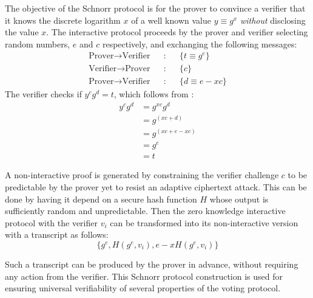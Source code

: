 The objective of the Schnorr protocol is for the prover to convince a
verifier that it knows the discrete logarithm $x$ of a well known
value $y \equiv g^x$ \emph{without} disclosing the value $x$.  The interactive
protocol proceeds by the prover and verifier selecting random numbers,
$e$ and $c$ respectively,
and exchanging the following messages:
\[
\begin{array}{lcccc} 
  \text{Prover} \rightarrow \text{Verifier} & & : & & \{ t \equiv g^e  \} \\
  \text{Verifier} \rightarrow \text{Prover} & & : & & \{ c \} \\
  \text{Prover} \rightarrow \text{Verifier} & & : & & \{ d \equiv e - xc \} 
\end{array}
\]
The verifier checks if $y^cg^d = t$, which follows from :
\begin{equation} \label{eq2}
\begin{split}
y^cg^d & = g^{xc}g^d \\
       & = g^{(xc + d)}  \\
       & = g^{(xc + e - xc)} \\
       & = g^e \\
       & = t 
\end{split}
\end{equation}

A non-interactive proof is generated by constraining the verifier challenge
$c$ to be predictable by the prover yet to resist an adaptive
ciphertext attack.
This can be done by having it depend on a secure hash function $H$ whose
output is sufficiently random and unpredictable.  Then the zero
knowledge interactive protocol with the verifier $v_i$
can be transformed into its non-interactive version with a
transcript as follows:
\[
\{ g^e , H(g^e, v_i) , e - xH(g^e, v_i) \} 
\]


Such a transcript can be produced by the prover in advance, without
requiring any action from the verifier.  This Schnorr protocol
construction is used for ensuring universal verifiability of several
properties of the voting protocol.
